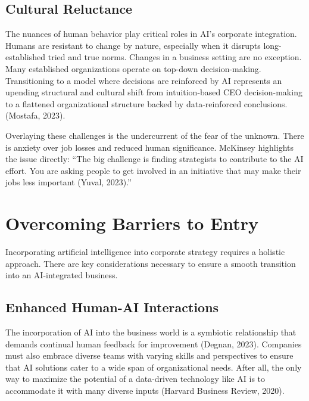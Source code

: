 \documentclass[
]{book}
\begin{document}
\hypertarget{cultural-reluctance}{%
\subsection{Cultural Reluctance}\label{cultural-reluctance}}

The nuances of human behavior play critical roles in AI's corporate integration. Humans are resistant to change by nature, especially when it disrupts long-established tried and true norms. Changes in a business setting are no exception. Many established organizations operate on top-down decision-making. Transitioning to a model where decisions are reinforced by AI represents an upending structural and cultural shift from intuition-based CEO decision-making to a flattened organizational structure backed by data-reinforced conclusions. (Mostafa, 2023).

Overlaying these challenges is the undercurrent of the fear of the unknown. There is anxiety over job losses and reduced human significance. McKinsey highlights the issue directly: ``The big challenge is finding strategists to contribute to the AI effort. You are asking people to get involved in an initiative that may make their jobs less important (Yuval, 2023).''

\hypertarget{overcoming-barriers-to-entry}{%
\section{Overcoming Barriers to Entry}\label{overcoming-barriers-to-entry}}

Incorporating artificial intelligence into corporate strategy requires a holistic approach. There are key considerations necessary to ensure a smooth transition into an AI-integrated business.

\hypertarget{enhanced-human-ai-interactions}{%
\subsection{Enhanced Human-AI Interactions}\label{enhanced-human-ai-interactions}}

The incorporation of AI into the business world is a symbiotic relationship that demands continual human feedback for improvement (Degnan, 2023). Companies must also embrace diverse teams with varying skills and perspectives to ensure that AI solutions cater to a wide span of organizational needs. After all, the only way to maximize the potential of a data-driven technology like AI is to accommodate it with many diverse inputs (Harvard Business Review, 2020).
\end{document}

